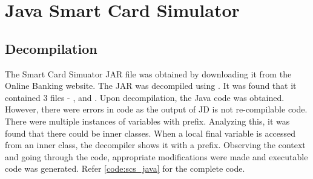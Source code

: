 \section{Java Smart Card Simulator}

\subsection{Decompilation}
The Smart Card Simuator JAR file was obtained by downloading it from the Online Banking website. The JAR was decompiled using . It was found that it contained 3 files - ,  and . Upon decompilation, the Java code was obtained. However, there were errors in code as the output of JD is not re-compilable code. There were multiple instances of variables with  prefix. Analyzing this, it was found that there could be inner classes. When a local final variable is accessed from an inner class, the decompiler shows it with a  prefix.
Observing the context and going through the code, appropriate modifications were made and executable code was generated. Refer \ref{code:scs_java} for the complete code.

